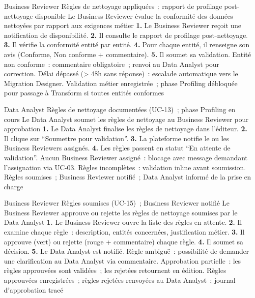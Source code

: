   {Business Reviewer}
  {Règles de nettoyage appliquées~; rapport de profilage post-nettoyage disponible}
  {Le Business Reviewer évalue la conformité des données nettoyées par rapport aux exigences métier}
  {\textbf{1.} Le Business Reviewer reçoit une notification de disponibilité. \textbf{2.} Il consulte le rapport de profilage post-nettoyage. \textbf{3.} Il vérifie la conformité entité par entité. \textbf{4.} Pour chaque entité, il renseigne son avis (Conforme, Non conforme + commentaire). \textbf{5.} Il soumet sa validation.}
  {Entité non conforme~: commentaire obligatoire~; renvoi au Data Analyst pour correction. Délai dépassé (> 48h sans réponse)~: escalade automatique vers le Migration Designer.}
  {Validation métier enregistrée~; phase Profiling débloquée pour passage à Transform si toutes entités conformes}

  {Data Analyst}
  {Règles de nettoyage documentées (UC-13)~; phase Profiling en cours}
  {Le Data Analyst soumet les règles de nettoyage au Business Reviewer pour approbation}
  {\textbf{1.} Le Data Analyst finalise les règles de nettoyage dans l'éditeur. \textbf{2.} Il clique sur ``Soumettre pour validation''. \textbf{3.} La plateforme notifie le ou les Business Reviewers assignés. \textbf{4.} Les règles passent en statut ``En attente de validation''.}
  {Aucun Business Reviewer assigné~: blocage avec message demandant l'assignation via UC-03. Règles incomplètes~: validation inline avant soumission.}
  {Règles soumises~; Business Reviewer notifié~; Data Analyst informé de la prise en charge}

  {Business Reviewer}
  {Règles soumises (UC-15)~; Business Reviewer notifié}
  {Le Business Reviewer approuve ou rejette les règles de nettoyage soumises par le Data Analyst}
  {\textbf{1.} Le Business Reviewer ouvre la liste des règles en attente. \textbf{2.} Il examine chaque règle~: description, entités concernées, justification métier. \textbf{3.} Il approuve (vert) ou rejette (rouge + commentaire) chaque règle. \textbf{4.} Il soumet sa décision. \textbf{5.} Le Data Analyst est notifié.}
  {Règle ambiguë~: possibilité de demander une clarification au Data Analyst via commentaire. Approbation partielle~: les règles approuvées sont validées~; les rejetées retournent en édition.}
  {Règles approuvées enregistrées~; règles rejetées renvoyées au Data Analyst~; journal d'approbation tracé}

